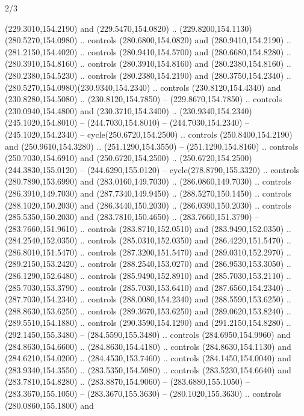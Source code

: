 \begin{flagdescription}{2/3}
\begin{scope}[xshift=0.5\flaglength,yshift=0.5\flagwidth,scale=\flagwidth/259.2]
\begin{scope}[y=0.8pt, x=0.8pt, yscale=-1,shift={(-243,-162)}]
      (229.3010,154.2190) and (229.5470,154.0820) ..
      (229.8200,154.1130)(280.5270,154.0980) .. controls (280.6800,154.0820) and
      (280.9410,154.2190) .. (281.2150,154.4020) .. controls (280.9410,154.5700) and
      (280.6680,154.8280) .. (280.3910,154.8160) .. controls (280.3910,154.8160) and
      (280.2380,154.8160) .. (280.2380,154.5230) .. controls (280.2380,154.2190) and
      (280.3750,154.2340) .. (280.5270,154.0980)(230.9340,154.2340) .. controls
      (230.8120,154.4340) and (230.8280,154.5080) .. (230.8120,154.7850) --
      (229.8670,154.7850) .. controls (230.0940,154.4800) and (230.3710,154.3400) ..
      (230.9340,154.2340)(245.1020,154.8010) -- (244.7030,154.8010) --
      (244.7030,154.2340) -- (245.1020,154.2340) -- cycle(250.6720,154.2500) ..
      controls (250.8400,154.2190) and (250.9610,154.3280) .. (251.1290,154.3550) --
      (251.1290,154.8160) .. controls (250.7030,154.6910) and (250.6720,154.2500) ..
      (250.6720,154.2500)(244.3830,155.0120) -- (244.6290,155.0120) --
      cycle(278.8790,155.3320) .. controls (280.7890,153.6990) and
      (283.0160,149.7030) .. (286.0860,149.7030) .. controls (286.3910,149.7030) and
      (287.7340,149.9450) .. (288.5270,150.1450) .. controls (288.1020,150.2030) and
      (286.3440,150.2030) .. (286.0390,150.2030) .. controls (285.5350,150.2030) and
      (283.7810,150.4650) .. (283.7660,151.3790) -- (283.7660,151.9610) .. controls
      (283.8710,152.0510) and (283.9490,152.0350) .. (284.2540,152.0350) .. controls
      (285.0310,152.0350) and (286.4220,151.5470) .. (286.8010,151.5470) .. controls
      (287.3200,151.5470) and (289.0310,152.2970) .. (289.2150,153.2420) .. controls
      (288.2540,153.0270) and (286.9530,153.3050) .. (286.1290,152.6480) .. controls
      (285.9490,152.8910) and (285.7030,153.2110) .. (285.7030,153.3790) .. controls
      (285.7030,153.6410) and (287.6560,154.2340) .. (287.7030,154.2340) .. controls
      (288.0080,154.2340) and (288.5590,153.6250) .. (288.8630,153.6250) .. controls
      (289.3670,153.6250) and (289.0620,153.8240) .. (289.5510,154.1880) .. controls
      (290.3590,154.1290) and (291.2150,154.8280) .. (292.1450,155.3480) --
      (284.5590,155.3480) .. controls (284.6950,154.9960) and (284.8630,154.6600) ..
      (284.8630,154.4180) .. controls (284.8630,154.1130) and (284.6210,154.0200) ..
      (284.4530,153.7460) .. controls (284.1450,154.0040) and (283.9340,154.3550) ..
      (283.5350,154.5080) .. controls (283.5230,154.6640) and (283.7810,154.8280) ..
      (283.8870,154.9060) -- (283.6880,155.1050) -- (283.3670,155.1050) --
      (283.3670,155.3630) -- (280.1020,155.3630) .. controls (280.0860,155.1800) and

\end{scope}
\end{scope}
\end{flagdescription}
